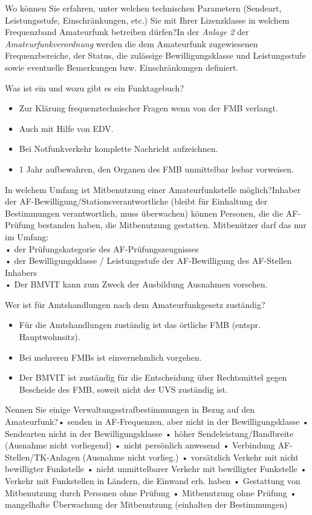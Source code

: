\documentclass[avery5371,grid,frame,a4paper]{flashcards}
\newcommand{\card}[3]{
  \begin{flashcard}[{\chap} -- #1]{#2}#3\end{flashcard}
}
\begin{document}
\card{34}{Wo können Sie erfahren, unter welchen technischen Parametern (Sendeart, Leistungsstufe, Einschränkungen, etc.) Sie mit Ihrer Lizenzklasse in welchem Frequenzband Amateurfunk betreiben dürfen?}{In der \emph{Anlage 2} der \emph{Amateurfunkverordnung}
werden die dem Amateurfunk zugewiesenen Frequenzbereiche, der Status, die zulässige Bewilligungsklasse und Leistungsstufe sowie eventuelle Bemerkungen bzw. Einschränkungen definiert.}

\card{35}{Was ist ein und wozu gibt es ein Funktagebuch?}{\begin{itemize}\itemsep0pt \item Zur Klärung frequenztechnischer Fragen wenn von der FMB verlangt. \item Auch mit Hilfe von EDV. \item Bei Notfunkverkehr komplette Nachricht aufzeichnen. \item 1 Jahr aufbewahren, den Organen des FMB unmittelbar lesbar vorweisen. \end{itemize}}

\card{36}{In welchem Umfang ist Mitbenutzung einer Amateurfunkstelle möglich?}{Inhaber der AF-Bewilligung/Stationsverantwortliche (bleibt für Einhaltung der Bestimmungen verantwortlich, muss überwachen) können Personen, die die AF-Prüfung bestanden haben, die Mitbenutzung gestatten. Mitbenützer darf das nur im Umfang: \\ • der Prüfungskategorie des AF-Prüfungszeugnisses \\ • der Bewilligungsklasse / Leistungsstufe der AF-Bewilligung des AF-Stellen Inhabers \\ • Der BMVIT kann zum Zweck der Ausbildung Ausnahmen vorsehen.}

\card{37}{Wer ist für Amtshandlungen nach dem Amateurfunkgesetz zuständig?}{\begin{itemize}\itemsep1pt \item Für die Amtshandlungen zuständig ist das örtliche FMB (entspr. Hauptwohnsitz). \item Bei mehreren FMBs ist einvernehmlich vorgehen. \item Der BMVIT ist zuständig für die Entscheidung über Rechtsmittel gegen Bescheide des FMB, soweit nicht der UVS
zuständig ist.\end{itemize}}

\card{38}{Nennen Sie einige Verwaltungsstrafbestimmungen in Bezug auf den Amateurfunk?}{\small{•  senden in AF-Frequenzen, aber nicht in der Bewilligungsklasse
•  Sendearten nicht in der Bewilligungsklasse
•  höher Sendeleistung/Bandbreite (Ausnahme nicht vorliegend)
•  nicht persönlich anwesend
•  Verbindung AF-Stellen/TK-Anlagen (Ausnahme nicht vorlieg.)
•  vorsätzlich Verkehr mit nicht bewilligter Funkstelle
•  nicht unmittelbarer Verkehr mit bewilligter Funkstelle
•  Verkehr mit Funkstellen in Ländern, die Einwand erh. haben
•  Gestattung von Mitbenutzung durch Personen ohne Prüfung
•  Mitbenutzung ohne Prüfung
•  mangelhafte Überwachung der Mitbenutzung (einhalten der Bestimmungen)}}
\end{document}
